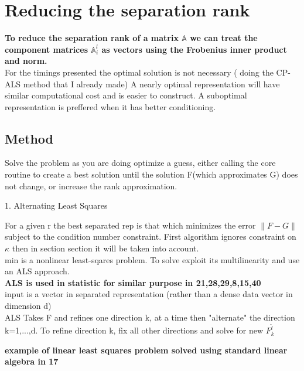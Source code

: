 \documentclass[10pt, draft]{article}
\begin{document}
 
 \section{Reducing the separation rank }
 
 \textbf{To reduce the separation rank of a matrix $\mathbb{A}$ we can treat the component matrices $\mathbb{A}_i^l$ as vectors using the Frobenius inner product and norm.}\\
 For the timings presented the optimal solution is not necessary ( doing the CP-ALS method that I already made) A nearly optimal representation will have similar computational cost and is easier to construct.  A suboptimal representation is preffered when it has better conditioning.  
 
 \subsection{Method}
 
 Solve the problem as you are doing optimize a guess, either calling the core routine to create a best solution until the solution F(which approximates G) does not change, or increase the rank approximation.  \linebreak[1]
 
 1. Alternating Least Squares \linebreak[1]
 
 For a given r the best separated rep is that which minimizes the error $\|F-G\|$ subject to the condition number constraint.  First algorithm ignores constraint on $\kappa$ then in section section it will be taken into account.  \\
 min is a nonlinear least-sqares problem.  To solve exploit its multilinearity and use an ALS approach.  \\
 \textbf{ALS is used in statistic for similar purpose in 21,28,29,8,15,40}\\
 input is a vector in separated representation (rather than a dense data vector in dimension d)\\
 ALS Takes F and refines one direction k, at a time then "alternate" the direction k=1,...,d.  To refine direction k, fix all other directions and solve for new $F^{\tilde{l}}_k$\linebreak[1]
 
 \textbf{example of linear least squares problem solved using standard linear algebra in 17}\linebreak[1]
 
\end{document}
